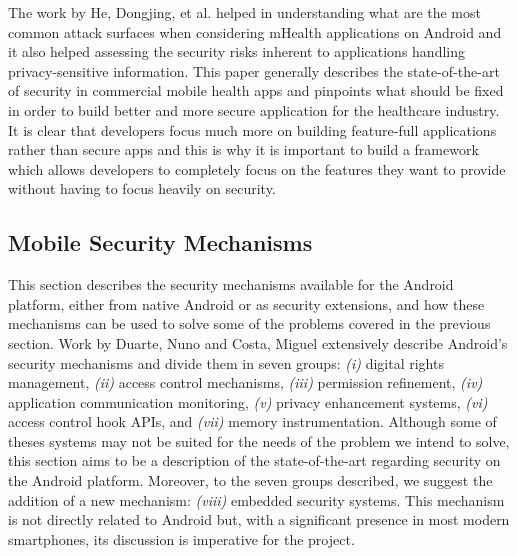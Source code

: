 The work by He, Dongjing, et al. \cite{he2014security} helped in understanding what are the most common attack surfaces when considering mHealth applications on Android and it also helped assessing the security risks inherent to applications handling privacy-sensitive information. This paper generally describes the state-of-the-art of security in commercial mobile health apps and pinpoints what should be fixed in order to build better and more secure application for the healthcare industry. It is clear that developers focus much more on building feature-full applications rather than secure apps and this is why it is important to build a framework which allows developers to completely focus on the features they want to provide without having to focus heavily on security. %

\subsection{Mobile Security Mechanisms}

This section describes the security mechanisms available for the Android platform, either from native Android or as security extensions, and how these mechanisms can be used to solve some of the problems covered in the previous section. Work by Duarte, Nuno \cite{nunoduarte} and Costa, Miguel \cite{miguelcosta} extensively describe Android's security mechanisms and divide them in seven groups: \emph{(i)} digital rights management, \emph{(ii)} access control mechanisms, \emph{(iii)} permission refinement, \emph{(iv)} application communication monitoring, \emph{(v)} privacy enhancement systems, \emph{(vi)} access control hook APIs, and \emph{(vii)} memory instrumentation. Although some of theses systems may not be suited for the needs of the problem we intend to solve, this section aims to be a description of the state-of-the-art regarding security on the Android platform. Moreover, to the seven groups described, we suggest the addition of a new mechanism: \emph{(viii)} embedded security systems. This mechanism is not directly related to Android but, with a significant presence in most modern smartphones, its discussion is imperative for the project.%

